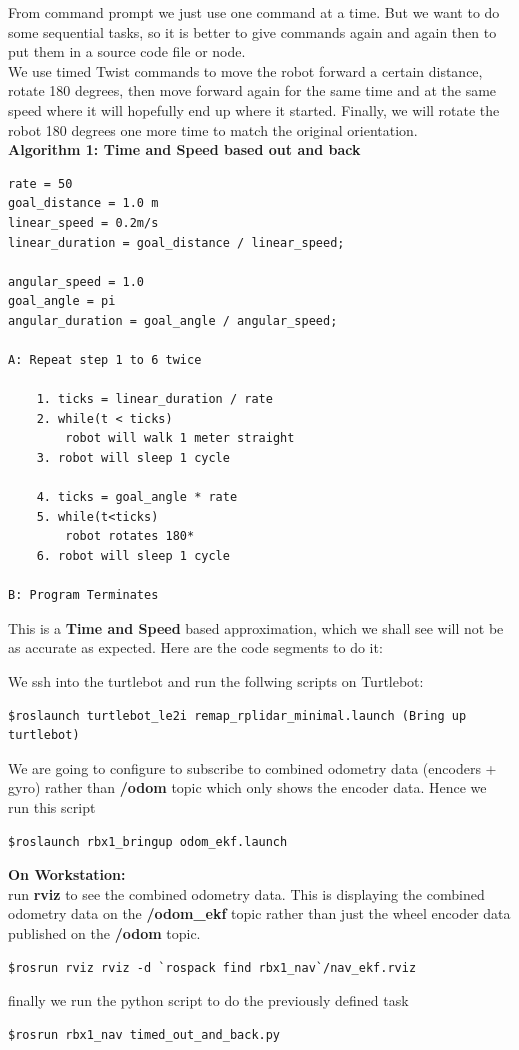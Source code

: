 \documentclass[10pt,a4paper]{article}
\begin{document}
From command prompt we just use one command at a time. But we want to do some sequential tasks, so it is better to give commands again and again then to put them in a source code file or node. \\
We use timed Twist commands to move the robot forward a certain distance, rotate 180 degrees, then move forward again for the same time and at the same speed where it will hopefully end up where it started. Finally, we will rotate the robot 180 degrees one more time to match the original orientation.\\

\textbf{Algorithm 1: Time and Speed based out and back}
\begin{lstlisting}[frame=single]
rate = 50
goal_distance = 1.0 m
linear_speed = 0.2m/s
linear_duration = goal_distance / linear_speed;

angular_speed = 1.0
goal_angle = pi
angular_duration = goal_angle / angular_speed;

A: Repeat step 1 to 6 twice

	1. ticks = linear_duration / rate
	2. while(t < ticks)
		robot will walk 1 meter straight
	3. robot will sleep 1 cycle
	
	4. ticks = goal_angle * rate
	5. while(t<ticks)
		robot rotates 180*
	6. robot will sleep 1 cycle
	
B: Program Terminates
\end{lstlisting}

This is a \textbf{Time and Speed} based approximation, which we shall see will not be as accurate as expected. Here are the code segments to do it:

We ssh into the turtlebot and run the follwing scripts
on Turtlebot:
\begin{lstlisting}[frame=single] 
$roslaunch turtlebot_le2i remap_rplidar_minimal.launch (Bring up turtlebot)
\end{lstlisting}
We are going to configure to subscribe to combined odometry data (encoders + gyro) 
rather than \textbf{/odom} topic which only shows the encoder data. Hence we run this script
\begin{lstlisting}[frame=single] 
$roslaunch rbx1_bringup odom_ekf.launch
\end{lstlisting}

\textbf{On Workstation:}\\
run \textbf{rviz} to see the combined odometry data. This is displaying the combined odometry data on the \textbf{/odom\_ekf} topic rather than just the wheel encoder data published on the \textbf{/odom} topic.
\begin{lstlisting}[frame=single] 
$rosrun rviz rviz -d `rospack find rbx1_nav`/nav_ekf.rviz
\end{lstlisting}
finally we run the python script to do the previously defined task 
\begin{lstlisting}[frame=single] 
$rosrun rbx1_nav timed_out_and_back.py
\end{lstlisting}
\end{document}
